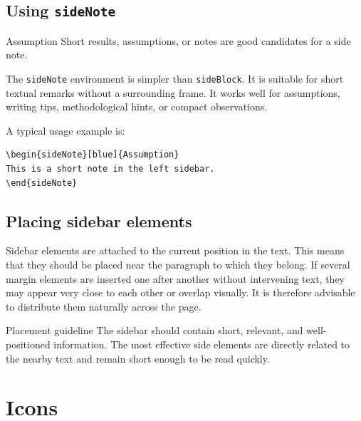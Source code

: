\documentclass[11pt,a4paper]{report}
\begin{document}
\section{Using \texttt{sideNote}}

\begin{sideNote}[blue]{Assumption}
Short results, assumptions, or notes are good candidates for a side note.
\end{sideNote}

The \texttt{sideNote} environment is simpler than \texttt{sideBlock}. It is suitable for short textual remarks without a surrounding frame. It works well for assumptions, writing tips, methodological hints, or compact observations.

A typical usage example is:

\begin{coloredBlock}[grey]{}
\begin{verbatim}
\begin{sideNote}[blue]{Assumption}
This is a short note in the left sidebar.
\end{sideNote}
\end{verbatim}
\end{coloredBlock}

\section{Placing sidebar elements}

Sidebar elements are attached to the current position in the text. This means that they should be placed near the paragraph to which they belong. If several margin elements are inserted one after another without intervening text, they may appear very close to each other or overlap visually. It is therefore advisable to distribute them naturally across the page.

\begin{coloredBlock}[blue]{Placement guideline}
The sidebar should contain short, relevant, and well-positioned information. The most effective side elements are directly related to the nearby text and remain short enough to be read quickly.
\end{coloredBlock}

\clearpage


\chapter{Icons}
\end{document}
